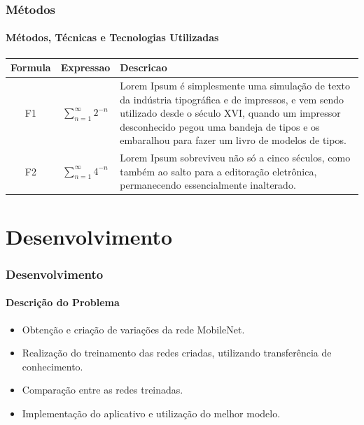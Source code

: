 \documentclass{beamer}
\begin{document}
    
    \begin{frame}
      \frametitle{Métodos}
      \framesubtitle{Métodos, Técnicas e Tecnologias Utilizadas}
      
        \begin{center}
            \begin{tabular}{ |c|c|p{7cm}| } 
            \hline
            Formula & Expressao & Descricao \\
            \hline
            \multirow{5}{*}{F1} & \multirow{5}{*}{$\sum_{n=1}^{\infty} 2^{-n}$} & \multirow{5}{7cm}{\footnotesize{Lorem Ipsum é simplesmente uma simulação de texto da indústria tipográfica e de impressos, e vem sendo utilizado desde o século XVI, quando um impressor desconhecido pegou uma bandeja de tipos e os embaralhou para fazer um livro de modelos de tipos.}~\cite{loremipsum}} \\ %
            & & \\ %
            & & \\ %
            & & \\ %
            & & \\ %
            \hline
            \multirow{3}{*}{F2} & \multirow{3}{*}{$\sum_{n=1}^{\infty} 4^{-n}$} & \multirow{3}{7cm}{\footnotesize{Lorem Ipsum sobreviveu não só a cinco séculos, como também ao salto para a editoração eletrônica, permanecendo essencialmente inalterado.}~\cite{loremipsum}} \\ %
            & & \\ %
            & & \\ %
            \hline
            \end{tabular}
        \end{center}
      
    \end{frame}
    
    \section{Desenvolvimento}
    
    \begin{frame}
      \frametitle{Desenvolvimento}
      \framesubtitle{Descrição do Problema}
      \begin{itemize}    
            \item Obtenção e criação de variações da rede MobileNet.
            \item Realização do treinamento das redes criadas, utilizando transferência de conhecimento.
            \item Comparação entre as redes treinadas.
            \item Implementação do aplicativo e utilização do melhor modelo.
            \end{itemize}
    \end{frame}
    
\end{document}
